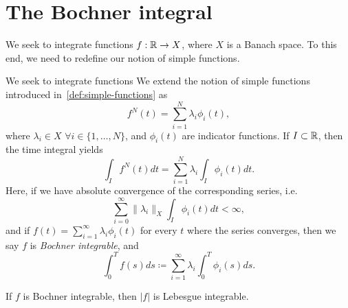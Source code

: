 \section{The Bochner integral}\label{sec:bochner}
We seek to integrate functions $f:\mathbb{R}\to X$, where $X$ is a Banach space. To this end, we need to redefine our notion of simple functions. 
\begin{definition}\label{def:bochner-integral}
    We seek to integrate functions  We extend the notion of simple functions introduced in~\ref{def:simple-functions} as %
    \begin{equation}
        f^N(t) = \sum_{i=1}^N \lambda_i \phi_i(t),
    \end{equation}
    where $\lambda_i \in X$ $\forall i\in\{1,\dots,N\}$, and $\phi_i(t)$ are indicator functions. If $I\subset \mathbb{R}$, then the time integral yields
    \begin{equation}
        \int_I f^N(t) dt = \sum_{i=1}^N \lambda_i \int_I \phi_i(t) dt.
    \end{equation}
    Here, if we have absolute convergence of the corresponding series, i.e. 
    \begin{equation}
        \sum_{i=0}^{\infty} \|\lambda_i\|_X \int_I \phi_i(t)dt <\infty,
    \end{equation}
    and if $f(t) = \sum_{i=1}^{\infty} \lambda_i \phi_i(t)$ for every $t$ where the series converges, then we say $f$ is \emph{Bochner integrable}, and
    \begin{equation}
        \int_0^T f(s)ds \coloneqq  \sum_{i=1}^\infty \lambda_i \int_0^T \phi_i(s)ds.
    \end{equation}    
\end{definition}
\begin{corollary}
    If $f$ is Bochner integrable, then $|f|$ is Lebesgue integrable. 
\end{corollary}

